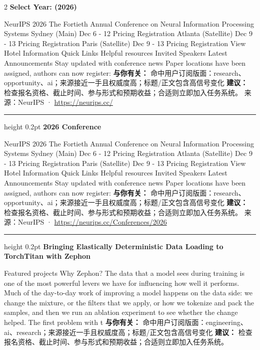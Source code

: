 \documentclass[10.5pt]{ctexart}
\begin{document}
\begin{multicols}{2}
{\large\bfseries Select Year: (2026)}\par
NeurIPS 2026 The Fortieth Annual Conference on Neural Information Processing Systems Sydney (Main) Dec 6 - 12 Pricing Registration Atlanta (Satellite) Dec 9 - 13 Pricing Registration Paris (Satellite) Dec 9 - 13 Pricing Registration View Hotel Information Quick Links Helpful resources Invited Speakers Latest Announcements Stay updated with conference news Paper locations have been assigned, authors can now register: 
\textbf{与你有关：} 命中用户订阅版面：research、opportunity、ai；来源接近一手且权威度高；标题/正文包含高信号变化
\textbf{建议：} 检查报名资格、截止时间、参与形式和预期收益；合适则立即加入任务系统。
{\footnotesize\color{ormuted} 来源：NeurIPS · \url{https://neurips.cc/}}
\vspace{2mm}
\hrule height 0.2pt
\vspace{2mm}
{\large\bfseries 2026 Conference}\par
NeurIPS 2026 The Fortieth Annual Conference on Neural Information Processing Systems Sydney (Main) Dec 6 - 12 Pricing Registration Atlanta (Satellite) Dec 9 - 13 Pricing Registration Paris (Satellite) Dec 9 - 13 Pricing Registration View Hotel Information Quick Links Helpful resources Invited Speakers Latest Announcements Stay updated with conference news Paper locations have been assigned, authors can now register: 
\textbf{与你有关：} 命中用户订阅版面：research、opportunity、ai；来源接近一手且权威度高；标题/正文包含高信号变化
\textbf{建议：} 检查报名资格、截止时间、参与形式和预期收益；合适则立即加入任务系统。
{\footnotesize\color{ormuted} 来源：NeurIPS · \url{https://neurips.cc/Conferences/2026}}
\vspace{2mm}
\hrule height 0.2pt
\vspace{2mm}
{\large\bfseries Bringing Elastically Deterministic Data Loading to TorchTitan with Zephon}\par
Featured projects Why Zephon? The data that a model sees during training is one of the most powerful levers we have for influencing how well it performs. Much of the day-to-day work of improving a model happens on the data side: we change the mixture, or the filters that we apply, or how we tokenize and pack the samples, and then we run an ablation experiment to see whether the change helped. The first problem with t
\textbf{与你有关：} 命中用户订阅版面：engineering、ai、research；来源接近一手且权威度高；标题/正文包含高信号变化
\textbf{建议：} 检查报名资格、截止时间、参与形式和预期收益；合适则立即加入任务系统。

\end{multicols}
\end{document}
